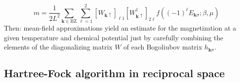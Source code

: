 \begin{equation}\label{appeq:antiferromagnet-magnetization-self-consistence-finite-temperature}
	m = \frac{1}{2L^2} \sum_{\mathbf{k} \in \mathrm{BZ}} \sum_{\ell=1}^2 
	[
		W_{\mathbf{k}\uparrow}
	]_{\ell 1} [
		W_{\mathbf{k}\uparrow}^\dagger
	]_{2 \ell}
	f\left(
		(-1)^\ell E_{\mathbf{k}\sigma}; \beta,\mu
	\right)
\end{equation}
Then: mean-field approximations yield an estimate for the magnetization at a given temperature and chemical potential just by carefully combining the elements of the diagonalizing matrix $W$ of each Bogoliubov matrix $h_{\mathbf{k}\sigma}$.

\subsection{Hartree-Fock algorithm in reciprocal space}\label{appsubsec:hartree-fock-algorithm}

